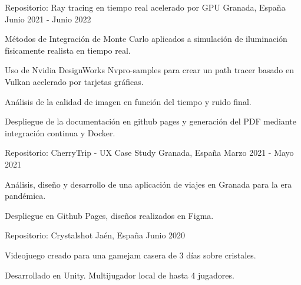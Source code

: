 
\begin{cventries}
    \cventry
      {Repositorio: }
      {Ray tracing en tiempo real acelerado por GPU}
      {Granada, España}
      {Junio 2021 - Junio 2022}
      {
        \begin{cvitems} %
          \item {Métodos de Integración de Monte Carlo aplicados a simulación de iluminación físicamente realista en tiempo real.}
          \item {Uso de Nvidia DesignWorks Nvpro-samples para crear un path tracer basado en Vulkan acelerado por tarjetas gráficas.}
          \item {Análisis de la calidad de imagen en función del tiempo y ruido final.}
          \item {Despliegue de la documentación en github pages y generación del PDF mediante integración continua y Docker.}
        \end{cvitems}
      }

    \cventry
      {Repositorio: }
      {CherryTrip - UX Case Study}
      {Granada, España}
      {Marzo 2021 - Mayo 2021}
      {
        \begin{cvitems} %
          \item {Análisis, diseño y desarrollo de una aplicación de viajes en Granada para la era pandémica.}
          \item {Despliegue en Github Pages, diseños realizados en Figma.}
        \end{cvitems}
      }

    \cventry
      {Repositorio: }
      {Crystalshot}
      {Jaén, España}
      {Junio 2020}
      {
        \begin{cvitems} %
          \item {Videojuego creado para una gamejam casera de 3 días sobre cristales.}
          \item {Desarrollado en Unity. Multijugador local de hasta 4 jugadores. }
        \end{cvitems}
      }
\end{cventries}